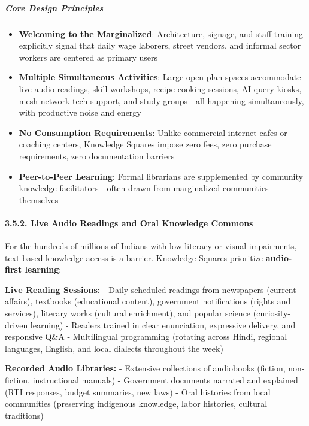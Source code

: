 \subparagraph{Core Design Principles}\label{core-design-principles}

\begin{itemize}
\tightlist
\item
  \textbf{Welcoming to the Marginalized}: Architecture, signage, and
  staff training explicitly signal that daily wage laborers, street
  vendors, and informal sector workers are centered as primary users
\item
  \textbf{Multiple Simultaneous Activities}: Large open-plan spaces
  accommodate live audio readings, skill workshops, recipe cooking
  sessions, AI query kiosks, mesh network tech support, and study
  groups---all happening simultaneously, with productive noise and
  energy
\item
  \textbf{No Consumption Requirements}: Unlike commercial internet cafes
  or coaching centers, Knowledge Squares impose zero fees, zero purchase
  requirements, zero documentation barriers
\item
  \textbf{Peer-to-Peer Learning}: Formal librarians are supplemented by
  community knowledge facilitators---often drawn from marginalized
  communities themselves
\end{itemize}

\paragraph{3.5.2. Live Audio Readings and Oral Knowledge
Commons}\label{live-audio-readings-and-oral-knowledge-commons}

For the hundreds of millions of Indians with low literacy or visual
impairments, text-based knowledge access is a barrier. Knowledge Squares
prioritize \textbf{audio-first learning}:

\textbf{Live Reading Sessions:} - Daily scheduled readings from
newspapers (current affairs), textbooks (educational content),
government notifications (rights and services), literary works (cultural
enrichment), and popular science (curiosity-driven learning) - Readers
trained in clear enunciation, expressive delivery, and responsive Q\&A -
Multilingual programming (rotating across Hindi, regional languages,
English, and local dialects throughout the week)

\textbf{Recorded Audio Libraries:} - Extensive collections of audiobooks
(fiction, non-fiction, instructional manuals) - Government documents
narrated and explained (RTI responses, budget summaries, new laws) -
Oral histories from local communities (preserving indigenous knowledge,
labor histories, cultural traditions)

